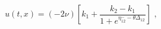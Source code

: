 \begin{equation}
u(t,x) = (-2\nu) \left[k_1 + \frac{k_2 - k_1}{1 + e^{\eta^-_{12} -
\theta\Delta_{12}}}\right]\,\,,  \label{eq:sol}
\end{equation}

